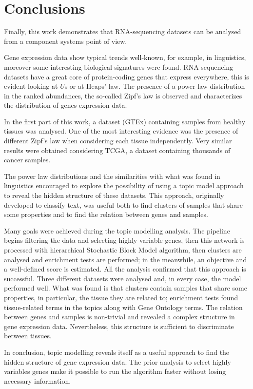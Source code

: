 \chapter{Conclusions}\label{ch:conclusions}
Finally, this work demonstrates that RNA-sequencing datasets can be analysed from a component systems point of view.

Gene expression data show typical trends well-known, for example, in linguistics, moreover some interesting biological signatures were found. RNA-sequencing datasets have a great core of protein-coding genes that express everywhere, this is evident looking at $U$s or at Heaps' law. The presence of a power law distribution in the ranked abundances, the so-called Zipf's law is observed and characterizes the distribution of genes expression data.

In the first part of this work, a dataset (GTEx) containing samples from healthy tissues was analysed. One of the most interesting evidence was the presence of different Zipf's law when considering each tissue independently. Very similar results were obtained considering TCGA, a dataset containing thousands of cancer samples.

The power law distributions and the similarities with what was found in linguistics encouraged to explore the possibility of using a topic model approach to reveal the hidden structure of these datasets. This approach, originally developed to classify text, was useful both to find clusters of samples that share some properties and to find the relation between genes and samples.

Many goals were achieved during the topic modelling analysis. The pipeline begins filtering the data and selecting highly variable genes, then this network is processed with hierarchical Stochastic Block Model algorithm, then clusters are analysed and enrichment tests are performed; in the meanwhile, an objective and a well-defined score is estimated. All the analysis confirmed that this approach is successful. Three different datasets were analysed and, in every case, the model performed well. What was found is that clusters contain samples that share some properties, in particular, the tissue they are related to; enrichment tests found tissue-related terms in the topics along with Gene Ontology terms. The relation between genes and samples is non-trivial and revealed a complex structure in gene expression data. Nevertheless, this structure is sufficient to discriminate between tissues.

In conclusion, topic modelling reveals itself as a useful approach to find the hidden structure of gene expression data. The prior analysis to select highly variables genes make it possible to run the algorithm faster without losing necessary information.

